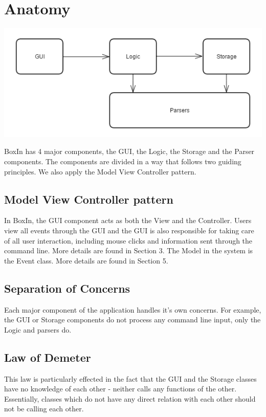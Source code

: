 \documentclass[12pt]{extarticle}
\begin{document}
\section{Anatomy}

\includegraphics[width=\textwidth]{architecture}

BoxIn has 4 major components, the GUI, the Logic, the Storage and the Parser components. The components are divided in a way that follows two guiding principles. We also apply the Model View Controller pattern.

\subsection{Model View Controller pattern}
In BoxIn, the GUI component acts as both the View and the Controller. Users view all events through the GUI and the GUI is also responsible for taking care of all user interaction, including mouse clicks and information sent through the command line. More details are found in Section 3.
The Model in the system is the Event class. More details are found in Section 5.

\subsection{Separation of Concerns}
Each major component of the application handles it's own concerns. For example, the GUI or Storage components do not process any command line input, only the Logic and parsers do.

\subsection{Law of Demeter}
This law is particularly effected in the fact that the GUI and the Storage classes have no knowledge of each other - neither calls any functions of the other. Essentially, classes which do not have any direct relation with each other should not be calling each other.
\end{document}
